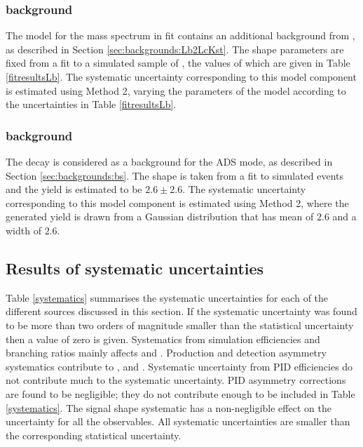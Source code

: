 \subsubsection{\boldmath {} background}

The model for the \kk mass spectrum in \CP fit contains an additional background from , as described in Section \ref{sec:backgrounds:Lb2LcKst}. The shape parameters are fixed from a fit to a simulated sample of , the values of which are given in Table \ref{fitresultsLb}. The systematic uncertainty corresponding to this model component is estimated using Method 2, varying the parameters of the model according to the uncertainties in Table \ref{fitresultsLb}.

\subsubsection{\boldmath {} background}

The decay  is considered as a background for the ADS mode, as described in Section \ref{sec:backgrounds:bs}. The shape is taken from a fit to simulated events and the yield is estimated to be $2.6 \pm 2.6$. The systematic uncertainty corresponding to this model component is estimated using Method 2, where the generated yield is drawn from a Gaussian distribution that has mean of $2.6$ and a width of $2.6$.

\subsection{Results of systematic uncertainties}

Table \ref{systematics} summarises the systematic uncertainties for each of the different sources discussed in this section. If the systematic uncertainty was found to be more than two orders of magnitude smaller than the statistical uncertainty then a value of zero is given. Systematics from simulation efficiencies and branching ratios mainly affects \Rkk and \Rpipi. Production and detection asymmetry systematics contribute to \Akpi, \Akk and \Apipi. Systematic uncertainty from PID efficiencies do not contribute much to the systematic uncertainty. PID asymmetry corrections are found to be negligible; they do not contribute enough to be included in Table \ref{systematics}. The signal shape systematic has a non-negligible effect on the uncertainty for all the \CP observables. All systematic uncertainties are smaller than the corresponding statistical uncertainty. 


